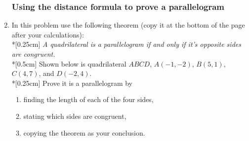 \documentclass[12pt, twoside]{article}
\begin{document}
\begin{enumerate}
\subsubsection*{Using the distance formula to prove a parallelogram}
\item In this problem use the following theorem (copy it at the bottom of the page after your calculations): \\*[0.25cm]
  \emph{A quadrilateral is a parallelogram if and only if it's opposite sides are congruent.}\\*[0.5cm]
  Shown below is quadrilateral $ABCD$, $A(-1,-2)$, $B(5,1)$, $C(4,7)$, and $D(-2,4)$. \\*[0.25cm]
  Prove it is a parallelogram by
  \begin{enumerate}
    \item finding the length of each of the four sides,
    \item stating which sides are congruent,
    \item copying the theorem as your conclusion.
  \end{enumerate}
  \begin{flushright} %
  \end{flushright}

\end{enumerate}
\end{document}
